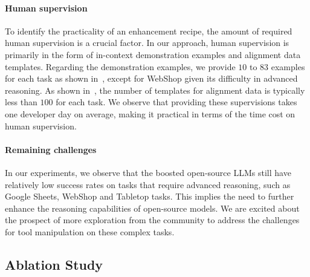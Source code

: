 \paragraph{Human supervision} To identify the practicality of an enhancement recipe, the amount of required human supervision is a crucial factor. In our approach, human supervision is primarily in the form of in-context demonstration examples and alignment data templates.
Regarding the demonstration examples, we provide $10$ to $83$ examples for each task as shown in~, except for WebShop given its difficulty in advanced reasoning.
As shown in~, the number of templates for alignment data is typically less than $100$ for each task. We observe that providing these supervisions takes one developer day on average, making it practical in terms of the time cost on human supervision.


\paragraph{Remaining challenges} In our experiments, we observe that the boosted open-source LLMs still have relatively low success rates on tasks that require advanced reasoning, such as Google Sheets, WebShop and Tabletop tasks. This implies the need to further enhance the reasoning capabilities of open-source models. We are excited about the prospect of more exploration from the community to address the challenges for tool manipulation on these complex tasks.




\subsection{Ablation Study}
\label{subsec:abl}

